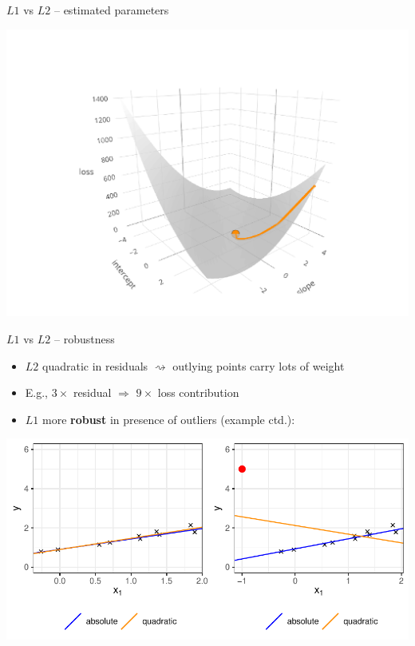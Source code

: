 \documentclass[11pt,compress,t,notes=noshow, xcolor=table]{beamer}
\begin{document}
\begin{vbframe}{$L1$ vs $L2$ -- estimated parameters}
\begin{minipage}[b]{0.34\textwidth}
    \vfill
    
    \includegraphics[width=\textwidth, trim=80 0 100 80, clip]{
    figure/reg_l1_comparison_optim_quad.pdf}
\end{minipage}

\end{vbframe}


\begin{vbframe}{$L1$ vs $L2$ -- robustness}

\begin{itemize}
    \item $L2$ quadratic in residuals $\rightsquigarrow$ outlying points 
    carry lots of weight
    \item E.g., $3 \times$ residual $\Rightarrow$ $9 \times$ loss contribution
    \item $L1$ more \textbf{robust} in presence of outliers (example ctd.):
\end{itemize}

\vfill
\includegraphics[width=\textwidth]{figure/reg_l1_comparison_outlier.pdf}

\end{vbframe}
\end{document}
